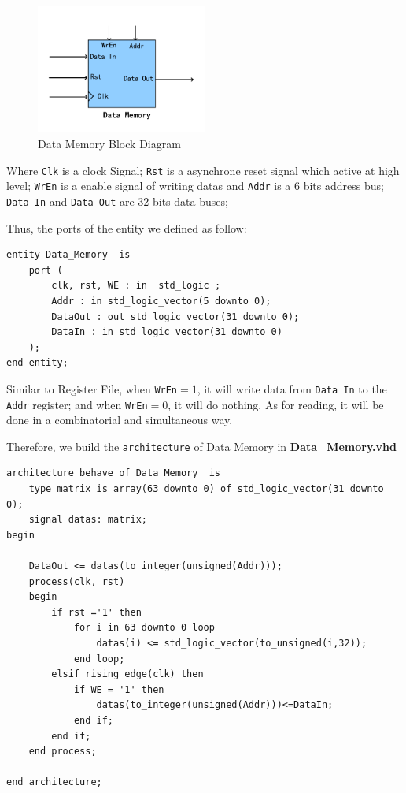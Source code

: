 \begin{figure}[htp]
    \centering
    \includegraphics[width=0.5\textwidth]{picture/DataMem.pdf}
    \caption{Data Memory Block Diagram}     
    \label{fig:DataMem}
\end{figure}

Where \texttt{Clk} is a clock Signal; \texttt{Rst} is a asynchrone reset signal which active at high level;
\texttt{WrEn} is a enable signal of writing datas and \texttt{Addr} is a 6 bits address bus;
\texttt{Data In} and \texttt{Data Out} are 32 bits data buses;

Thus, the ports of the entity we defined as follow:

\begin{lstlisting}[style=vhdl]
entity Data_Memory  is 
	port (
		clk, rst, WE : in  std_logic ; 
		Addr : in std_logic_vector(5 downto 0);
		DataOut : out std_logic_vector(31 downto 0);
		DataIn : in std_logic_vector(31 downto 0)
	);
end entity;
\end{lstlisting}

Similar to Register File, when \texttt{WrEn}$=1$, it will write data from \texttt{Data In} to the \texttt{Addr} register;
and when \texttt{WrEn}$=0$, it will do nothing. As for reading, it will be done
in a combinatorial and simultaneous way.

Therefore, we build the \texttt{architecture} of Data Memory in \textbf{Data\_Memory.vhd}

\begin{lstlisting}[style=vhdl]
architecture behave of Data_Memory  is
	type matrix is array(63 downto 0) of std_logic_vector(31 downto 0);
	signal datas: matrix;
begin

	DataOut <= datas(to_integer(unsigned(Addr))); 
	process(clk, rst) 
	begin 
		if rst ='1' then 
			for i in 63 downto 0 loop
				datas(i) <= std_logic_vector(to_unsigned(i,32));
			end loop;
		elsif rising_edge(clk) then 
			if WE = '1' then 
				datas(to_integer(unsigned(Addr)))<=DataIn; 
			end if; 
		end if; 
	end process; 

end architecture;
\end{lstlisting}


